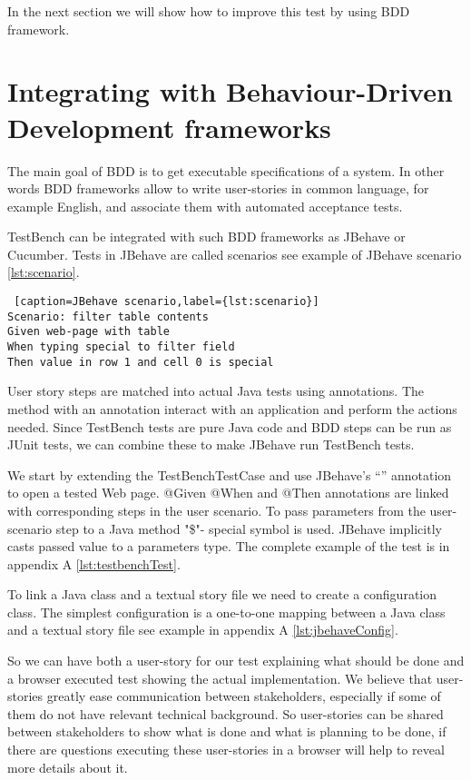 In the next section we will show how to improve this test by using
BDD framework.

\section{Integrating with Behaviour-Driven Development frameworks}

The main goal of BDD is to get executable specifications of a system.
In other words BDD frameworks allow  to write user-stories in
common language, for example English, and associate them with automated
acceptance tests.

TestBench can be integrated with such BDD frameworks as JBehave
\cite{jBehaveSite} or Cucumber\cite{cucumberSite}.
Tests in JBehave are called scenarios see example of JBehave scenario
\ref{lst:scenario}.

 \lstset{style=console}
  \begin{lstlisting} [caption=JBehave scenario,label={lst:scenario}]
Scenario: filter table contents
Given web-page with table
When typing special to filter field
Then value in row 1 and cell 0 is special
  \end{lstlisting}
User story steps are matched into actual Java tests using annotations. 
The method with an annotation interact with an application and perform the actions needed.
Since TestBench tests are pure Java code and BDD steps can be run as JUnit tests, we can combine these to make
JBehave run TestBench tests.

We start by extending the TestBenchTestCase  and use JBehave's ``\@BeforeScenario''
annotation to open a tested Web page.  @Given @When and @Then annotations are
linked with corresponding steps in the user scenario.
To pass parameters from the user-scenario step to a Java method "\$"- special symbol is used.
JBehave implicitly casts passed value to a parameters type. The complete example
of the test is in appendix A \ref{lst:testbenchTest}.

To link a Java class and a textual story file we need to create a configuration class.
The simplest configuration is a one-to-one mapping between a Java class and a textual story file
see example in appendix A \ref{lst:jbehaveConfig}. 

So we can have both a user-story for our test explaining what should be done and a browser executed
test showing the actual implementation. We believe that user-stories 
greatly ease communication between stakeholders, 
especially if some of them do not have relevant technical background.
So user-stories can be shared between stakeholders to show what is done and what
is planning to be done, if there are questions 
executing these user-stories in a browser will help to reveal more details about it. 
